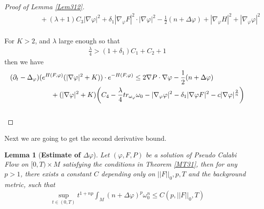 \documentclass[11pt]{amsart}
\newtheorem{lem}{Lemma}[section]
\numberwithin{equation}{section}
\begin{document}
\begin{proof}[Proof of Lemma \ref{Lem312}]
\begin{align}
	&\qquad\qquad +(\lambda+1)C_3|\nabla\varphi|^2 + \delta_1 |\nabla_\varphi F|^2\cdot |\nabla\varphi|^2-\frac{1}{2}(n+\Delta\varphi ) +|\nabla_\varphi H|^2+|\nabla_\varphi\varphi|^2
\end{align} \\
For $K>2$, and $\lambda$ large enough so that
\begin{align}
	\frac{\lambda}{4}>(1+\delta_1)C_1+C_2+1
\end{align}
then we have 
\begin{align}
	&(\partial_t-\Delta_{\varphi})(e^{H(F,\varphi)}(|\nabla\varphi|^2+K))\cdot e^{-H(F,\varphi)}  \le  2\nabla P\cdot\nabla\varphi -\frac{1}{2}(n+\Delta\varphi)       \notag \\
	&\quad\quad\quad\quad\quad\quad +(|\nabla\varphi|^2+K)\bigg( C_4 -\frac{\lambda}{4}tr_{\omega_{\varphi}}\omega_0 -|\nabla_\varphi\varphi|^2 -\delta_1|\nabla\varphi F|^2 - c|\nabla\varphi|^{\frac{2}{n}}\bigg) 
\end{align}\\
\end{proof}











\noindent
Next we are going to get the second derivative bound. \\

\begin{lem}[\textbf{Estimate of $\Delta\varphi$}]\label{Lem313}
		Let $(\varphi,F,P)$ be a solution of Pseudo Calabi Flow on $[0,T)\times M$ satisfying the conditions in Theorem \ref{MT31}, then for any $p>1$,  there exists a constant $C$ depending only on $||F||_0, p, T$ and the background metric,  such that 
		\begin{align}
		\sup_{t \in (0,T)} t^{1 + np} \int_M (n + \Delta\varphi)^p \omega_{0}^n \le  C (p,||F||_0,T)
		\end{align} \\
\end{lem}
\end{document}

